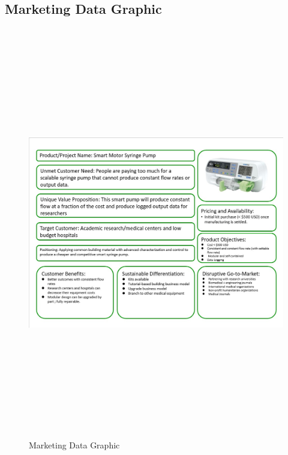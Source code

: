 \documentclass[journal]{IEEEtran}
\begin{document}
        \newpage
        \quad
        \newpage
        
    \subsection{Marketing Data Graphic}
        \begin{figure}[H]
            \centering
            \includegraphics[width = 22cm, height = 18cm, angle=90]{Images/Marketing model.jpg}
            \caption{Marketing Data Graphic}
            \label{fig:market_sheet}
        \end{figure}
        
        \newpage
        \quad
        \newpage
        
\end{document}
